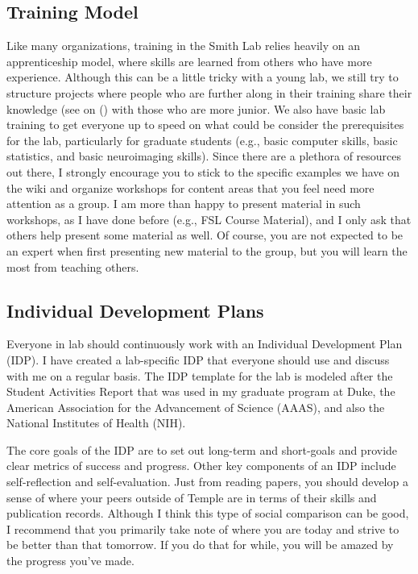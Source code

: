 \documentclass[letterpaper,12pt,oneside]{memoir}
\begin{document}
\subsection{Training Model}
\label{sec:training}

Like many organizations, training in the Smith Lab relies heavily on an apprenticeship model, where skills are learned from others who have more experience. Although this can be a little tricky with a young lab, we still try to structure projects where people who are further along in their training share their knowledge (see  on () with those who are more junior. We also have basic lab training to get everyone up to speed on what could be consider the prerequisites for the lab, particularly for graduate students (e.g., basic computer skills, basic statistics, and basic neuroimaging skills). Since there are a plethora of resources out there, I strongly encourage you to stick to the specific examples we have on the wiki and organize workshops for content areas that you feel need more attention as a group. I am more than happy to present material in such workshops, as I have done before (e.g., FSL Course Material), and I only ask that others help present some material as well. Of course, you are not expected to be an expert when first presenting new material to the group, but you will learn the most from teaching others.

\subsection{Individual Development Plans}
Everyone in lab should continuously work with an Individual Development Plan (IDP). I have created a lab-specific IDP that everyone should use and discuss with me on a regular basis. The IDP template for the lab is modeled after the Student Activities Report that was used in my graduate program at Duke, the American Association for the Advancement of Science (AAAS), and also the National Institutes of Health (NIH). 

The core goals of the IDP are to set out long-term and short-goals and provide clear metrics of success and progress. Other key components of an IDP include self-reflection and self-evaluation. Just from reading papers, you should develop a sense of where your peers outside of Temple are in terms of their skills and publication records. Although I think this type of social comparison can be good, I recommend that you primarily take note of where you are today and strive to be better than that tomorrow. If you do that for while, you will be amazed by the progress you've made.
\end{document}
